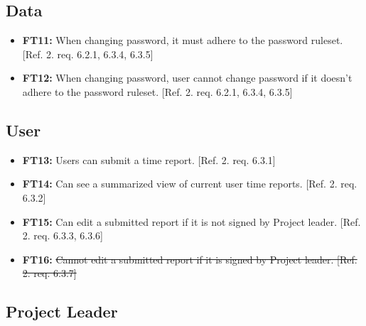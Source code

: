 \documentclass{article}
\begin{document}
		\subsection{Data}
		
		\begin{itemize}
		
  			\item \textbf{FT11:} When changing password, it must adhere to the password ruleset. [Ref. 2. req. 6.2.1, 6.3.4, 6.3.5]
  			
  			\item \textbf{FT12:} When changing password, user cannot change password if it doesn't adhere to the password ruleset. [Ref. 2. req. 6.2.1, 6.3.4, 6.3.5]
  			

		\end{itemize}
		
		\subsection{User}
		
		\begin{itemize}
  			\item \textbf{FT13:} Users can submit a time report. [Ref. 2. req. 6.3.1]
  			
  			\item \textbf{FT14:} Can see a summarized view of current user time reports. [Ref. 2. req. 6.3.2]
  			
  			\item \textbf{FT15:} Can edit a submitted report if it is not signed by Project leader. [Ref. 2. req. 6.3.3, 6.3.6]
  			
  			 \item \textbf{FT16:}\sout{ Cannot edit a submitted report if it is signed by Project leader. [Ref. 2. req. 6.3.7]}


		\end{itemize}
		
		\subsection{Project Leader}
		
\end{document}
